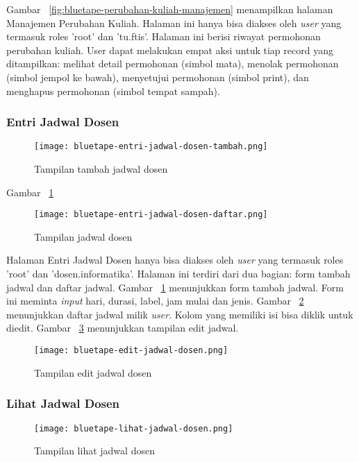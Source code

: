 	Gambar~ \ref{fig:bluetape-perubahan-kuliah-manajemen} menampilkan halaman Manajemen Perubahan Kuliah. Halaman ini hanya bisa diakses oleh \textit{user} yang termasuk roles 'root' dan 'tu.ftis'. Halaman ini berisi riwayat permohonan perubahan kuliah. User dapat melakukan empat aksi untuk tiap record yang ditampilkan: melihat detail permohonan (simbol mata), menolak permohonan (simbol jempol ke bawah), menyetujui permohonan (simbol print), dan menghapus permohonan (simbol tempat sampah).
	
	\subsubsection{Entri Jadwal Dosen}
	\begin{figure}[H]
		\centering  
		\texttt{[image: bluetape-entri-jadwal-dosen-tambah.png]}  
		\caption[Tampilan tambah jadwal dosen]{Tampilan tambah jadwal dosen} 
		\label{fig:bluetape-entri-jadwal-dosen-tambah} 
	\end{figure}
	
	Gambar~ \ref{fig:bluetape-entri-jadwal-dosen-tambah}
	\begin{figure}[H]
		\centering  
		\texttt{[image: bluetape-entri-jadwal-dosen-daftar.png]}  
		\caption[Tampilan jadwal dosen]{Tampilan jadwal dosen} 
		\label{fig:bluetape-entri-jadwal-dosen-daftar} 
	\end{figure}
	
	Halaman Entri Jadwal Dosen hanya bisa diakses oleh \textit{user} yang termasuk roles 'root' dan 'dosen.informatika'. Halaman ini terdiri dari dua bagian: form tambah jadwal dan daftar jadwal. Gambar~ \ref{fig:bluetape-entri-jadwal-dosen-tambah} menunjukkan form tambah jadwal. Form ini meminta \textit{input} hari, durasi, label, jam mulai dan jenis. Gambar~ \ref{fig:bluetape-entri-jadwal-dosen-daftar} menunjukkan daftar jadwal milik \textit{user}. Kolom yang memiliki isi bisa diklik untuk diedit. Gambar~ \ref{fig:bluetape-edit-jadwal-dosen} menunjukkan tampilan edit jadwal.
	
	\begin{figure}[H]
		\centering  
		\texttt{[image: bluetape-edit-jadwal-dosen.png]}  
		\caption[Tampilan edit jadwal dosen]{Tampilan edit jadwal dosen} 
		\label{fig:bluetape-edit-jadwal-dosen} 
	\end{figure}

	\subsubsection{Lihat Jadwal Dosen}
	\begin{figure}[H]
		\centering  
		\texttt{[image: bluetape-lihat-jadwal-dosen.png]}  
		\caption[Tampilan lihat jadwal dosen]{Tampilan lihat jadwal dosen} 
		\label{fig:bluetape-lihat-jadwal-dosen} 
	\end{figure}
	
